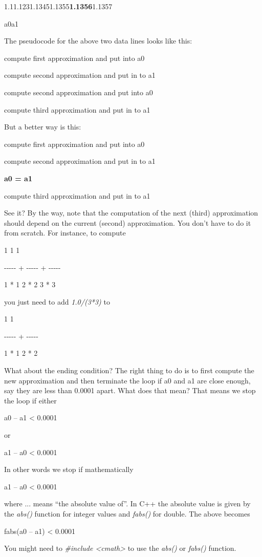 \documentclass[
]{article}
\begin{document}
1.11.1231.13451.1355\textbf{1.1356}1.1357

a0a1

The pseudocode for the above two data lines looks like this:

compute first approximation and put into a0

compute second approximation and put in to a1

compute second approximation and put into a0

compute third approximation and put in to a1

But a better way is this:

compute first approximation and put into a0

compute second approximation and put in to a1

\textbf{a0 = a1}

compute third approximation and put in to a1

See it? By the way, note that the computation of the next (third)
approximation should depend on the current (second) approximation. You
don't have to do it from scratch. For instance, to compute

1 1 1

-\/-\/-\/-\/- + -\/-\/-\/-\/- + -\/-\/-\/-\/-

1 * 1 2 * 2 3 * 3

you just need to add \emph{1.0/(3*3)} to

1 1

-\/-\/-\/-\/- + -\/-\/-\/-\/-

1 * 1 2 * 2

What about the ending condition? The right thing to do is to first
compute the new approximation and then terminate the loop if a0 and a1
are close enough, say they are less than 0.0001 apart. What does that
mean? That means we stop the loop if either

a0 -- a1 \textless{} 0.0001

or

a1 -- a0 \textless{} 0.0001

In other words we stop if mathematically

\textbar{} a1 -- a0 \textbar{} \textless{} 0.0001

where \textbar{} ... \textbar{} means ``the absolute value of''. In C++
the absolute value is given by the \emph{abs()} function for integer
values and \emph{fabs()} for double. The above becomes

fabs(a0 -- a1) \textless{} 0.0001

You might need to \emph{\#include \textless cmath\textgreater{}} to use
the \emph{abs()} or \emph{fabs()} function.
\end{document}
